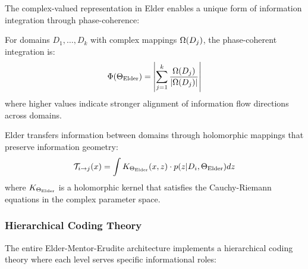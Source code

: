 The complex-valued representation in Elder enables a unique form of information integration through phase-coherence:

\begin{definition}
For domains $D_1, \ldots, D_k$ with complex mappings $\Omega(D_j)$, the phase-coherent integration is:
\begin{equation}
\Phi(\Theta_{\text{Elder}}) = \left| \sum_{j=1}^k \frac{\Omega(D_j)}{|\Omega(D_j)|} \right|
\end{equation}
where higher values indicate stronger alignment of information flow directions across domains.
\end{definition}

\begin{theorem}
Elder transfers information between domains through holomorphic mappings that preserve information geometry:
\begin{equation}
\mathcal{T}_{i \to j}(x) = \int K_{\Theta_{\text{Elder}}}(x, z) \cdot p(z | D_i, \Theta_{\text{Elder}}) dz
\end{equation}
where $K_{\Theta_{\text{Elder}}}$ is a holomorphic kernel that satisfies the Cauchy-Riemann equations in the complex parameter space.
\end{theorem}

\subsubsection{Hierarchical Coding Theory}

The entire Elder-Mentor-Erudite architecture implements a hierarchical coding theory where each level serves specific informational roles:

